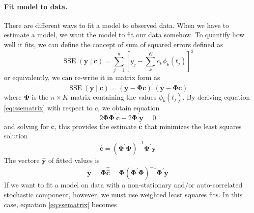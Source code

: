 \paragraph{Fit model to data.} There are different ways to fit a model to observed data. When we have to estimate a model, we want the model to fit our data somehow. To quantify how well it fits, we can define the concept of sum of squared errors defined as
\begin{equation}
    \label{eq:sse}
    \operatorname{SSE}(\mathbf{y} \mid \mathbf{c})=\sum_{j=1}^n\left[y_j-\sum_k^K c_k \phi_k\left(t_j\right)\right]^2
\end{equation}
or equivalently, we can re-write it in matrix form as
\begin{equation}
    \label{eq:ssematrix}
    \operatorname{SSE}(\bm{y} \mid \mathbf{c})=(\mathbf{y}-\bm{\Phi} \mathbf{c})^{\prime}(\mathbf{y}-\bm{\Phi} \mathbf{c})
\end{equation}
where $\bm{\Phi}$ is the $n \times K$ matrix containing the values $\phi_k(t_j)$. By deriving equation \ref{eq:ssematrix} with respect to $c$, we obtain equation
\begin{equation}
 \label{eq:c}
    2 \bm{\Phi} \bm{\Phi}^{\prime} \mathbf{c}-2 \bm{\Phi}^{\prime} \mathbf{y}=0
\end{equation}
and solving for $\mathbf{c}$, this provides the estimate $\hat{\mathbf{c}}$ that minimizes the least squares solution
\begin{equation}
    \label{eq:cestimated}
    \hat{\mathbf{c}}=\left(\bm{\Phi}^{\prime} \bm{\Phi}\right)^{-1} \bm{\Phi}^{\prime} \mathbf{y}
\end{equation}
The vectore $\hat{\mathbf{y}}$ of fitted values is
\begin{equation}
    \hat{\mathbf{y}}=\bm{\Phi} \hat{\hat{\mathbf{c}}}=\bm{\Phi}\left(\bm{\Phi}^{\prime} \bm{\Phi}\right)^{-1} \bm{\Phi}^{\prime} \mathbf{y}
\end{equation}
If we want to fit a model on data with a non-stationary and/or auto-correlated stochastic component, however, we must use weighted least squares fits. In this case, equation \ref{eq:ssematrix} becomes

